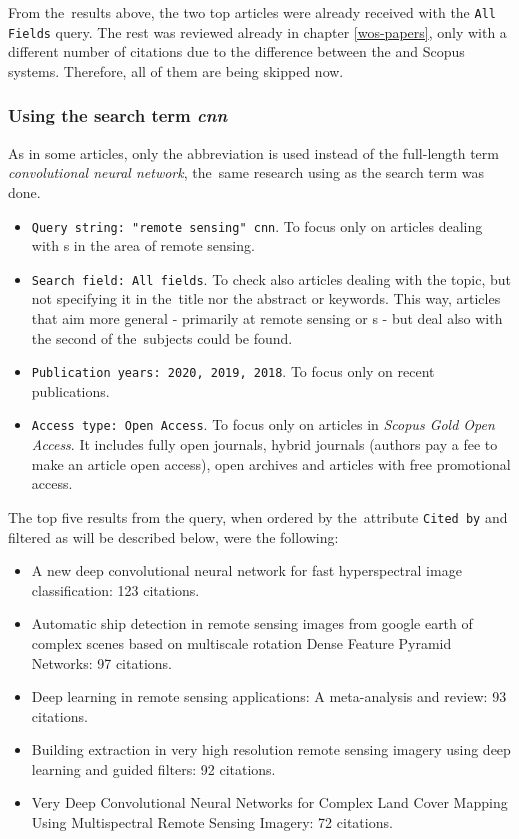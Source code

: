 From the~results above, the two top articles were already received with the \verb|All Fields| query. The rest was reviewed already in chapter \ref{wos-papers}, only with a different number of citations due to the difference between the  and Scopus systems. Therefore, all of them are being skipped now.

\subsubsection{Using the search term \textit{cnn}}
\label{scopus-papers-cnn}

As in some articles, only the abbreviation \textit{} is used instead of the full-length term \textit{convolutional neural network}, the~same research using \textit{} as the search term was done.

\begin{itemize}
	\item \verb|Query string: "remote sensing" cnn|. To focus only on articles dealing with s in the area of remote sensing.
	\item \verb|Search field: All fields|. To check also articles dealing with the topic, but not specifying it in the~title nor the abstract or keywords. This way, articles that aim more general - primarily at remote sensing or s - but deal also with the second of the~subjects could be found.
	\item \verb|Publication years: 2020, 2019, 2018|. To focus only on recent publications.
	\item \verb|Access type: Open Access|. To focus only on articles in \textit{Scopus Gold Open Access}. It includes fully open journals, hybrid journals (authors pay a fee to make an article open access), open archives and articles with free promotional access.
\end{itemize}

\noindent The top five results from the query, when ordered by the~attribute \verb|Cited by| and filtered as will be described below, were the following:

\begin{itemize}
	\item A new deep convolutional neural network for fast hyperspectral image classification: 123 citations.  \cite{cnn-hs-class}
	\item Automatic ship detection in remote sensing images from google earth of complex scenes based on multiscale rotation Dense Feature Pyramid Networks: 97 citations. \cite{ship-rdfpn}
	\item Deep learning in remote sensing applications: A meta-analysis and review: 93 citations. \cite{dl-remote-sensing-review}
	\item Building extraction in very high resolution remote sensing imagery using deep learning and guided filters: 92 citations. \cite{res-u-net}
	\item Very Deep Convolutional Neural Networks for Complex Land Cover Mapping Using Multispectral Remote Sensing Imagery: 72 citations. \cite{very-deep-cnn-lc}
\end{itemize}

